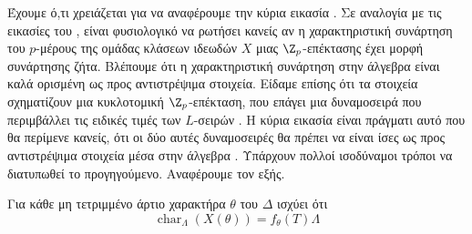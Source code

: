 Έχουμε ό,τι χρειάζεται για να αναφέρουμε την κύρια εικασία . Σε αναλογία με τις εικασίες του , είναι φυσιολογικό να ρωτήσει κανείς αν η χαρακτηριστική συνάρτηση του  $p$-μέρους της ομάδας κλάσεων ιδεωδών $X$ μιας $\Z_p$-επέκτασης έχει μορφή συνάρτησης ζήτα. Βλέπουμε ότι η χαρακτηριστική συνάρτηση στην άλγεβρα  είναι καλά ορισμένη ως προς αντιστρέψιμα στοιχεία. Είδαμε επίσης ότι τα  στοιχεία σχηματίζουν μια κυκλοτομική $\Z_p$-επέκταση, που επάγει μια δυναμοσειρά που περιμβάλλει τις ειδικές τιμές των $L$-σειρών . Η κύρια εικασία  είναι πράγματι αυτό που θα περίμενε κανείς, ότι οι δύο αυτές δυναμοσειρές θα πρέπει να είναι ίσες ως προς αντιστρέψιμα στοιχεία μέσα στην άλγεβρα . Υπάρχουν πολλοί ισοδύναμοι τρόποι να διατυπωθεί το προγηγούμενο. Αναφέρουμε τον εξής.

\begin{theorem}
	Για κάθε μη τετριμμένο άρτιο χαρακτήρα $\theta$ του $\Delta$ ισχύει ότι
	$$\operatorname{char}_{\Lambda}(X(\theta)) = f_{\theta}(T)\Lambda$$
\end{theorem}